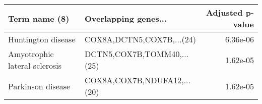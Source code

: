 \begin{tabular}{llr}
\toprule
                Term name (8) &        Overlapping genes... &  Adjusted p-value \\
\midrule
           Huntington disease &   COX8A,DCTN5,COX7B,...(24) &          6.36e-06 \\
Amyotrophic lateral sclerosis &  DCTN5,COX7B,TOMM40,...(25) &          1.62e-05 \\
            Parkinson disease & COX8A,COX7B,NDUFA12,...(20) &          1.62e-05 \\
\bottomrule
\end{tabular}
